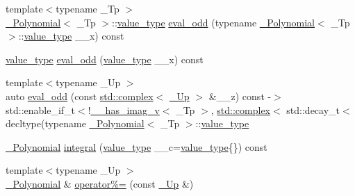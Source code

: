 \begin{DoxyCompactItemize}
\item 
{\footnotesize template$<$typename \+\_\+\+Tp $>$ }\\\hyperlink{class____gnu__cxx_1_1__Polynomial}{\+\_\+\+Polynomial}$<$ \+\_\+\+Tp $>$\+::\hyperlink{class____gnu__cxx_1_1__Polynomial_a725563351f50e76084a7a016c06f8a53}{value\+\_\+type} \hyperlink{class____gnu__cxx_1_1__Polynomial_acd4fd2288b7dd7a5933e84ae372d4769}{eval\+\_\+odd} (typename \hyperlink{class____gnu__cxx_1_1__Polynomial}{\+\_\+\+Polynomial}$<$ \+\_\+\+Tp $>$\+::\hyperlink{class____gnu__cxx_1_1__Polynomial_a725563351f50e76084a7a016c06f8a53}{value\+\_\+type} \+\_\+\+\_\+x) const
\item 
\hyperlink{class____gnu__cxx_1_1__Polynomial_a725563351f50e76084a7a016c06f8a53}{value\+\_\+type} \hyperlink{class____gnu__cxx_1_1__Polynomial_aff02472cad1aa3b6c8d067fdd4b11bc0}{eval\+\_\+odd} (\hyperlink{class____gnu__cxx_1_1__Polynomial_a725563351f50e76084a7a016c06f8a53}{value\+\_\+type} \+\_\+\+\_\+x) const
\item 
{\footnotesize template$<$typename \+\_\+\+Up $>$ }\\auto \hyperlink{class____gnu__cxx_1_1__Polynomial_a5348bf4c4db826660a133ab731f775c1}{eval\+\_\+odd} (const \hyperlink{classstd_1_1complex}{std\+::complex}$<$ \hyperlink{class____gnu__cxx_1_1__Polynomial_a242114d4b86648a5dff67a8221f80d40}{\+\_\+\+Up} $>$ \&\+\_\+\+\_\+z) const -\/$>$ std\+::enable\+\_\+if\+\_\+t$<$!\hyperlink{namespace____gnu__cxx_afa2404a914b06f950f3a46e75aca51a9}{\+\_\+\+\_\+has\+\_\+imag\+\_\+v}$<$ \+\_\+\+Tp $>$, \hyperlink{classstd_1_1complex}{std\+::complex}$<$ std\+::decay\+\_\+t$<$ decltype(typename \hyperlink{class____gnu__cxx_1_1__Polynomial}{\+\_\+\+Polynomial}$<$ \+\_\+\+Tp $>$\+::\hyperlink{class____gnu__cxx_1_1__Polynomial_a725563351f50e76084a7a016c06f8a53}{value\+\_\+type}
\item 
\hyperlink{class____gnu__cxx_1_1__Polynomial}{\+\_\+\+Polynomial} \hyperlink{class____gnu__cxx_1_1__Polynomial_a4f9871fb66fc6075767f1db61a323fd0}{integral} (\hyperlink{class____gnu__cxx_1_1__Polynomial_a725563351f50e76084a7a016c06f8a53}{value\+\_\+type} \+\_\+\+\_\+c=\hyperlink{class____gnu__cxx_1_1__Polynomial_a725563351f50e76084a7a016c06f8a53}{value\+\_\+type}\{\}) const
\item 
{\footnotesize template$<$typename \+\_\+\+Up $>$ }\\\hyperlink{class____gnu__cxx_1_1__Polynomial}{\+\_\+\+Polynomial} \& \hyperlink{class____gnu__cxx_1_1__Polynomial_ade8196c94c8e169f00730730d0c6b99e}{operator\%=} (const \hyperlink{class____gnu__cxx_1_1__Polynomial_a242114d4b86648a5dff67a8221f80d40}{\+\_\+\+Up} \&)

\end{DoxyCompactItemize}

